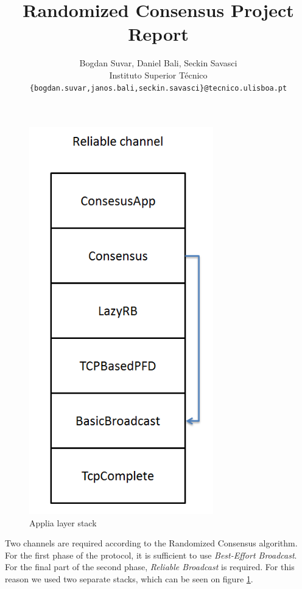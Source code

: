 \documentclass[times, 12pt,twocolumn]{article}
\begin{document}
\title{Randomized Consensus Project Report}

\author{Bogdan Suvar, Daniel Bali, Seckin Savasci\\
Instituto Superior T\'{e}cnico\\
\texttt{\{bogdan.suvar,janos.bali,seckin.savasci\}@tecnico.ulisboa.pt}\\
}
 
\maketitle
\thispagestyle{empty}




\begin{figure}[ht!]
\centering
\includegraphics[width=80mm]{stack.png}
\caption{Applia layer stack}
\label{fig:stack}
\end{figure}

Two channels are required according to the Randomized Consensus algorithm. 
For the first phase of the protocol, it is sufficient to use 
\textit{Best-Effort Broadcast}. For the final part of the second phase, 
\textit{Reliable Broadcast} is required. For this reason we used two 
separate stacks, which can be seen on figure \ref{fig:stack}.
\end{document}
